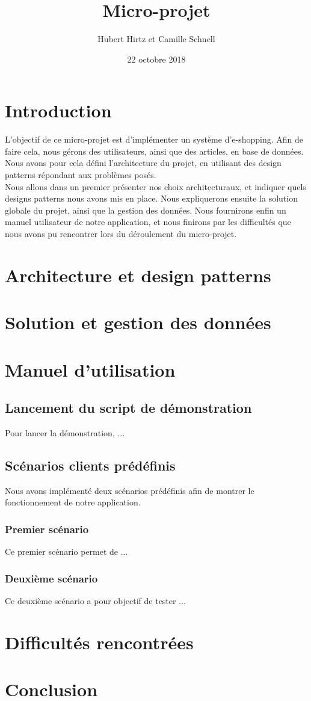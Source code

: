 \documentclass[12pt]{article}
\title{Micro-projet}
\author{Hubert Hirtz et Camille Schnell}
\date{22 octobre 2018}
\begin{document}
\maketitle
\renewcommand{\contentsname}{Sommaire}
\tableofcontents
\newpage
\section{Introduction}
  L'objectif de ce micro-projet est d'implémenter un système d'e-shopping. Afin de faire cela, nous gérons des utilisateurs, ainsi que des articles, en base de données. Nous avons pour cela défini l'architecture du projet, en utilisant des design patterns répondant aux problèmes posés. \\
  Nous allons dans un premier présenter nos choix architecturaux, et indiquer quels designs patterns nous avons mis en place. Nous expliquerons ensuite la solution globale du projet, ainsi que la gestion des données. Nous fournirons enfin un manuel utilisateur de notre application, et nous finirons par les difficultés que nous avons pu rencontrer lors du déroulement du micro-projet.
\newpage
\section{Architecture et design patterns}
\newpage
\section{Solution et gestion des données}
\newpage
\section{Manuel d'utilisation}
    \subsection{Lancement du script de démonstration}
    Pour lancer la démonstration, ...
    \subsection{Scénarios clients prédéfinis}
    Nous avons implémenté deux scénarios prédéfinis afin de montrer le fonctionnement de notre application.
    \subsubsection{Premier scénario}
    Ce premier scénario permet de ...
    \subsubsection{Deuxième scénario}
    Ce deuxième scénario a pour objectif de tester ...
\newpage
\section{Difficultés rencontrées}

\newpage
\section{Conclusion}
\end{document}
